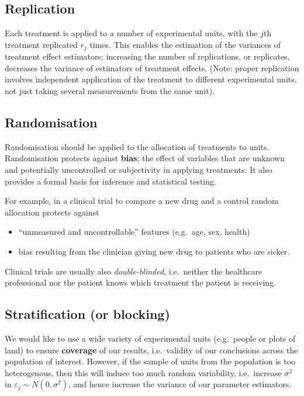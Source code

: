\documentclass[
]{book}
\providecommand{\tightlist}{%
  \setlength{\itemsep}{0pt}\setlength{\parskip}{0pt}}
\theoremstyle{definition}
\theoremstyle{definition}
\theoremstyle{definition}
\theoremstyle{definition}
\theoremstyle{remark}
\begin{document}
\hypertarget{replication}{%
\subsection{Replication}\label{replication}}

Each treatment is applied to a number of experimental units, with the \(j\)th treatment replicated \(r_{j}\) times. This enables the estimation of the variances of treatment effect estimators; increasing the number of replications, or replicates, decreases the variance of estimators of treatment effects.
(Note: proper replication involves independent application of the treatment to different experimental units, not just taking several measurements from the same unit).

\hypertarget{randomisation}{%
\subsection{Randomisation}\label{randomisation}}

Randomisation should be applied to the allocation of treatments to units. Randomisation protects against \textbf{bias}; the effect of
variables that are unknown and potentially uncontrolled or
subjectivity in applying treatments. It also provides a formal basis
for inference and statistical testing.

For example, in a clinical trial to compare a new drug and a control random allocation protects against

\begin{itemize}
\tightlist
\item
  ``unmeasured and uncontrollable'' features (e.g.~age, sex, health)
\item
  bias resulting from the clinician giving new drug to patients who are sicker.
\end{itemize}

Clinical trials are usually also \emph{double-blinded}, i.e.~neither the healthcare professional nor the patient knows which treatment the patient is receiving.

\hypertarget{blocking}{%
\subsection{Stratification (or blocking)}\label{blocking}}

We would like to use a wide variety of experimental units (e.g.~people or plots of land) to ensure \textbf{coverage} of our results, i.e.~validity of our conclusions across the population of interest. However, if the sample of units from the population is too heterogenous, then this will induce too much random variability, i.e.~increase \(\sigma^{2}\) in \(\varepsilon_{j}\sim N(0,\sigma^{2})\), and hence increase the variance of our parameter estimators.
\end{document}
